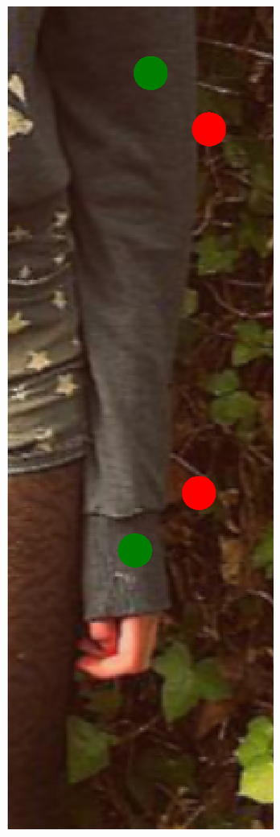 \begin{figure}[!t]
    \newcommand{\fh}{0.24\columnwidth}
    \centering
    \includegraphics[height=\fh]{resources/Fixing/fix_1}
    \hfill

\end{figure}
